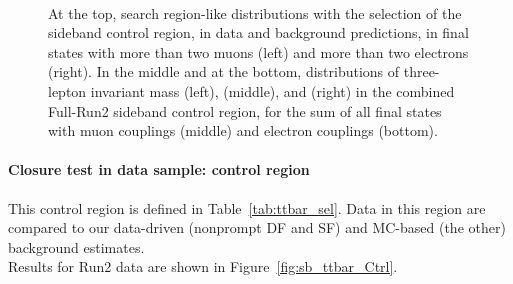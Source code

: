 \begin{figure}[h]
\noindent
  \\
  \caption{At the top, search region-like distributions with the selection of the
    sideband control region, in data and background
    predictions, in final states with more than two muons (left) and
    more than two electrons (right). In the middle and at the bottom, distributions of three-lepton invariant mass (left), \mtwol
    (middle), and \Deltwod (right) in the combined Full-Run2 sideband control region,
    for the sum of all final states with muon couplings (middle) and
    electron couplings (bottom).}
  \label{fig:sb_sr_Ctrl}
\end{figure}

\vspace{10cm}
\paragraph*{Closure test in data sample: \PQb control region}
This control region is defined in Table~\ref{tab:ttbar_sel}.
Data in this region are compared to our data-driven (nonprompt DF and
SF) and MC-based (the other) background estimates.\\
Results for Run2 data  are shown in
Figure~\ref{fig:sb_ttbar_Ctrl}.

